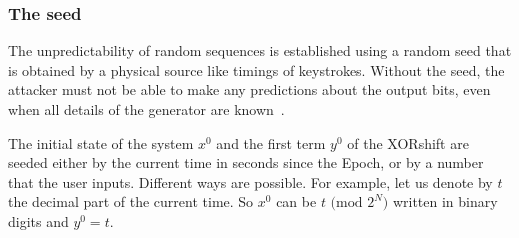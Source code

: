 \documentclass[journal]{IEEEtran}
\begin{document}
\subsubsection{The seed}
\label{algo seed}
The unpredictability of random sequences is established using
a random seed that is obtained by a physical source like timings of keystrokes.
Without the seed, the attacker must not be able to make any predictions about
the output bits, even when all details of the generator are known~\cite{Turan2008}.

The initial state of the system $x^0$ and the first term $y^0$ of the XORshift are seeded either by
the current time in seconds since the Epoch, or by a number that the user inputs.
Different ways are possible. For example, let us denote by $t$ the decimal part of the current
time. So $x^0$ can be $t \text{ (mod $2^N$)}$ written in binary digits and $y^0 = t$.
\end{document}
